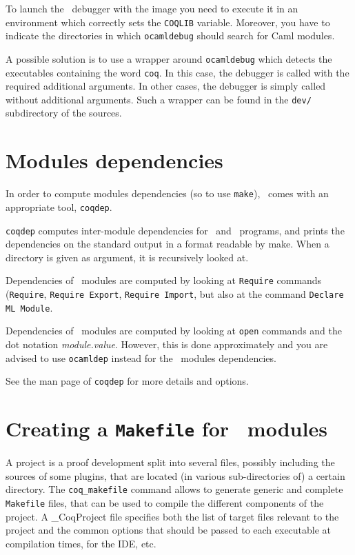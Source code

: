 To launch the \ocaml\ debugger with the image you need to execute it in
an environment which correctly sets the \texttt{COQLIB} variable.
Moreover, you have to indicate the directories in which
\texttt{ocamldebug} should search for Caml modules.

A possible solution is to use a wrapper around \texttt{ocamldebug}
which detects the executables containing the word \texttt{coq}. In
this case, the debugger is called with the required additional
arguments. In other cases, the debugger is simply called without additional
arguments. Such a wrapper can be found in the \texttt{dev/}
subdirectory of the sources.

\section[Modules dependencies]{Modules dependencies\label{Dependencies}
  }

In order to compute modules dependencies (so to use {\tt make}),
\Coq\ comes with an appropriate tool, {\tt coqdep}.

{\tt coqdep} computes inter-module dependencies for \Coq\ and
\ocaml\ programs, and prints the dependencies on the standard
output in a format readable by make.  When a directory is given as
argument, it is recursively looked at.

Dependencies of \Coq\ modules are computed by looking at {\tt Require}
commands ({\tt Require}, {\tt Requi\-re Export}, {\tt Require Import},
but also at the command {\tt Declare ML Module}.

Dependencies of \ocaml\ modules are computed by looking at
\verb!open! commands and the dot notation {\em module.value}. However,
this is done approximately and you are advised to use {\tt ocamldep}
instead for the \ocaml\ modules dependencies.

See the man page of {\tt coqdep} for more details and options.


\section[Creating a {\tt Makefile} for \Coq\ modules]{Creating a {\tt Makefile} for \Coq\ modules\label{Makefile}
}

A project is a proof development split into several files, possibly
including the sources of some {\ocaml} plugins, that are located (in
various sub-directories of) a certain directory. The
\texttt{coq\_makefile} command allows to generate generic and complete
\texttt{Makefile} files, that can be used to compile the different
components of the project. A \_CoqProject file
specifies both the list of target files relevant to the project
and the common options that should be passed to each executable at
compilation times, for the IDE, etc.

